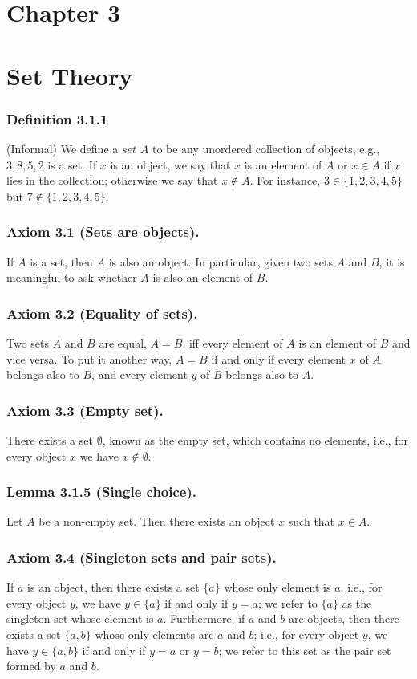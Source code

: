 \documentclass[12pt, letter]{article}
\begin{document}
\section*{Chapter 3}
\section*{Set Theory}
\subsubsection*{Definition 3.1.1}
(Informal) We define a $set$ $A$ to be any unordered collection of objects, e.g., ${3,8,5,2}$ is a set. If $x$ is an object, we say that $x$ is an element of $A$ or $x\in A$ if $x$ lies in the collection;
otherwise we say that $x\notin A$. For instance, $3\in\{1,2,3,4,5\}$ but $7\notin \{1,2,3,4,5\}$.
\subsubsection*{Axiom 3.1 (Sets are objects).} 
If $A$ is a set, then $A$ is also an object. In particular, given two sets $A$ and $B$, it is meaningful to ask whether $A$ is also an element of $B$.
\subsubsection*{Axiom 3.2 (Equality of sets).}
Two sets $A$ and $B$ are equal, $A=B$, iff every element of $A$ is an element of $B$ and vice versa. To put it another way, $A=B$ if and only if every element $x$ of $A$ belongs also to $B$, and every element $y$
of $B$ belongs also to $A$.
\subsubsection*{Axiom 3.3 (Empty set).}
There exists a set $\emptyset$, known as the empty set, which contains no elements, i.e., for every object $x$ we have $x\notin\emptyset$. 
\subsubsection*{Lemma 3.1.5 (Single choice).}
Let $A$ be a non-empty set. Then there exists an object $x$ such that $x\in A$. 
\subsubsection*{Axiom 3.4 (Singleton sets and pair sets).}
If $a$ is an object, then there exists a set $\{a\}$ whose only element is $a$, i.e., for every object $y$, we have $y\in\{a\}$ if and only if $y=a$; we refer to $\{a\}$ as the singleton set 
whose element is $a$. Furthermore, if $a$ and $b$ are objects, then there exists a set $\{a, b\}$ whose only elements are $a$ and $b$; i.e., for every object $y$, we have $y\in\{a,b\}$ if and only if $y=a$ or $y=b$; 
we refer to this set as the pair set formed by $a$ and $b$.
\end{document}
